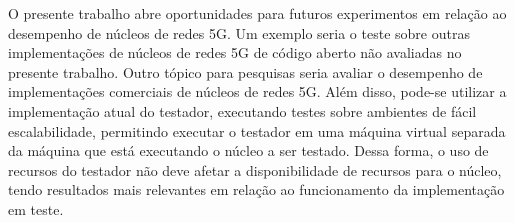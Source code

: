 O presente trabalho abre oportunidades para futuros experimentos em relação ao desempenho de núcleos de redes 5G.
Um exemplo seria o teste sobre outras implementações de núcleos de redes 5G de código aberto não avaliadas no presente trabalho.
Outro tópico para pesquisas seria avaliar o desempenho de implementações comerciais de núcleos de redes 5G.
Além disso, pode-se utilizar a implementação atual do testador, executando testes sobre ambientes de fácil escalabilidade, permitindo executar o testador em uma máquina virtual separada da máquina que está executando o núcleo a ser testado.
Dessa forma, o uso de recursos do testador não deve afetar a disponibilidade de recursos para o núcleo, tendo resultados mais relevantes em relação ao funcionamento da implementação em teste.
